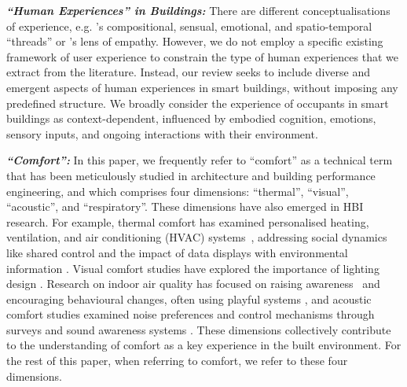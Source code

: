 \textbf{\textit{``Human Experiences'' in Buildings:}} There are different conceptualisations of experience, e.g. \citet{wright2003making}'s compositional, sensual, emotional, and spatio-temporal ``threads'' or \citet{wright2008empathy}'s lens of empathy. However, we do not employ a specific existing framework of user experience to constrain the type of human experiences that we extract from the literature. Instead, our review seeks to include diverse and emergent aspects of human experiences in smart buildings, without imposing any predefined structure. We broadly consider the experience of occupants in smart buildings as context-dependent, influenced by embodied cognition, emotions, sensory inputs, and ongoing interactions with their environment. 

\textbf{\textit{``Comfort'':}} In this paper, we frequently refer to ``comfort'' as a technical term that has been meticulously studied in architecture and building performance engineering, and which comprises four dimensions: ``thermal'', ``visual'', ``acoustic'', and ``respiratory''. These dimensions have also emerged in HBI research. For example, thermal comfort has examined personalised heating, ventilation, and air conditioning (HVAC) systems~\cite{chhaglani2022flowsense, khare2023thermal}, addressing social dynamics like shared control \cite{von2021towards, mazzone2021socially} and the impact of data displays with environmental information \cite{clear2018thermokiosk}. Visual comfort studies have explored the importance of lighting design \cite{boyce2003human, bian2023simulation, zheng2023daylighting}. 
Research on indoor air quality has focused on raising awareness~\cite{zhong2020hilo} and encouraging behavioural changes, often using playful systems \cite{snow2019performance, gaver2013indoor}, and acoustic comfort studies examined noise preferences and control mechanisms through surveys \cite{marques2020real, passero2012acoustic} and sound awareness systems \cite{wozniak2012maintaining, olry2020prisme}. These dimensions collectively contribute to the understanding of comfort as a key experience in the built environment. For the rest of this paper, when referring to comfort, we refer to these four dimensions. 

